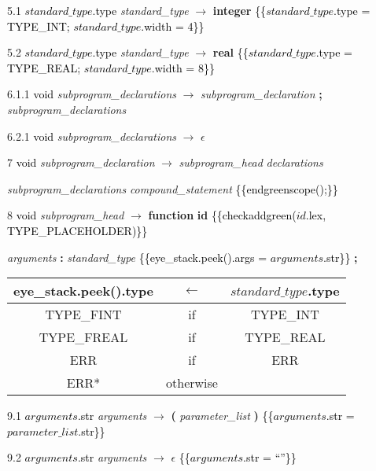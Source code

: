 5.1  \textcolor{black}{$standard\_type$.type} \emph{standard\_type} $\rightarrow$ \textbf{integer} \textcolor{black}{\{\{$standard\_type$.type = TYPE\_INT; $standard\_type$.width = 4\}\}}

5.2  \textcolor{black}{$standard\_type$.type} \emph{standard\_type} $\rightarrow$ \textbf{real} \textcolor{black}{\{\{$standard\_type$.type = TYPE\_REAL; $standard\_type$.width = 8\}\}}

6.1.1  \textcolor{black}{void} \emph{subprogram\_declarations} $\rightarrow$ \emph{subprogram\_declaration} \textbf{;} \emph{subprogram\_declarations}

6.2.1  \textcolor{black}{void} \emph{subprogram\_declarations} $\rightarrow$ $\epsilon$

7    \textcolor{black}{void} \emph{subprogram\_declaration} $\rightarrow$ \emph{subprogram\_head} \emph{declarations}

\emph{subprogram\_declarations} \emph{compound\_statement} \textcolor{black}{\{\{endgreenscope();\}\}}

8  \textcolor{black}{void}  \emph{subprogram\_head} $\rightarrow$ \textbf{function} \textbf{id} \textcolor{black}{\{\{checkaddgreen($id$.lex, TYPE\_PLACEHOLDER)\}\}}

\emph{arguments} \textbf{:} \emph{standard\_type} \textcolor{black}{\{\{eye\_stack.peek().args = $arguments$.str\}\}} \textbf{;}

\begin{tabular}[t]{|ccc|}
  \hline

  eye\_stack.peek().type & \textbf{$\leftarrow$} & $standard\_type$.type \\

  \hline

  TYPE\_FINT & if & TYPE\_INT \\

  TYPE\_FREAL & if & TYPE\_REAL \\

  ERR  & if & ERR \\

  ERR* & otherwise & \\

  \hline
\end{tabular}


9.1  \textcolor{black}{$arguments$.str} \emph{arguments} $\rightarrow$ \textbf{(} \emph{parameter\_list} \textbf{)} \textcolor{black}{\{\{$arguments$.str = $parameter\_list$.str\}\}}

9.2  \textcolor{black}{$arguments$.str} \emph{arguments} $\rightarrow$ $\epsilon$ \textcolor{black}{\{\{$arguments$.str = ``''\}\}}

